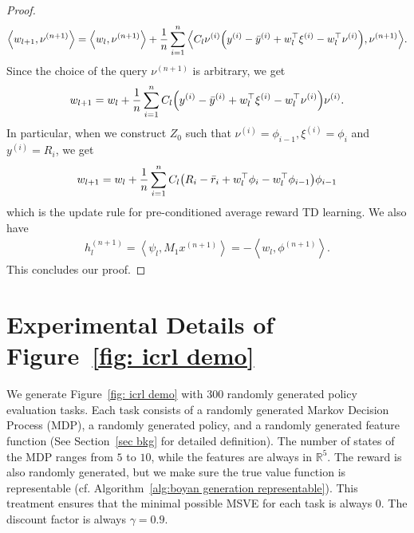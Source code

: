\documentclass{article}
\newcommand{\R}{\mathbb{R}}
\newcommand{\indot}[2]{{\left<#1, #2\right>}}
\begin{document}
\begin{proof}
    \begin{align}
        \indot{w_{l+1}}{\nu^{(n+1)}}
        = \indot{w_l}{\nu^{(n+1)}}
        + \frac{1}{n} \sum_{i=1}^n
        \indot{C_l \nu^{(i)} \qty(y^{(i)} - \bar{y}^{(i)} + w_l^\top \xi^{(i)} - w_l^\top \nu^{(i)})}{
        \nu^{(n+1)}}.
    \end{align}
    Since the choice of the query $\nu^{(n+1)}$ is arbitrary, we get
     \begin{align}
        w_{l+1} = w_l + \frac{1}{n}\sum_{i=1}^n C_l \qty(y^{(i)} - \bar{y}^{(i)} + w_l^\top \xi^{(i)} - w_l^\top \nu^{(i)}) \nu^{(i)}.
    \end{align}
    In particular, when we construct $Z_0$ such that $\nu^{(i)} = \phi_{i-1}, \xi^{(i)} = \phi_i$ and $y^{(i)} = R_i$, we get
    \begin{align}
        w_{l+1} = w_l + \frac{1}{n}\sum_{i=1}^n C_l \qty(R_i - \bar{r}_i + w_l^\top \phi_i - w_l^\top \phi_{i-1}) \phi_{i-1}
    \end{align}
    which is the update rule for pre-conditioned average reward TD learning.
    We also have
    \begin{align}
        h_l^{(n+1)}
        = \indot{\psi_l}{M_1 x^{(n+1)}}
        = -\indot{w_l}{\phi^{(n+1)}}.
    \end{align}
    This concludes our proof.
  \end{proof}
\section{Experimental Details of Figure~\ref{fig: icrl demo}}
\label{appendix: demo}
We generate Figure~\ref{fig: icrl demo} with 300 randomly generated policy evaluation tasks.
Each task consists of a randomly generated Markov Decision Process (MDP),
a randomly generated policy, and a randomly generated feature function (See Section~\ref{sec bkg} for detailed definition).
The number of states of the MDP ranges from $5$ to $10$,
while the features are always in $\R^5$.
The reward is also randomly generated, but we make sure the true value function is representable (cf. Algorithm~\ref{alg:boyan generation representable}).
This treatment ensures that the minimal possible MSVE for each task is always 0.
The discount factor is always $\gamma = 0.9$.
\end{document}

